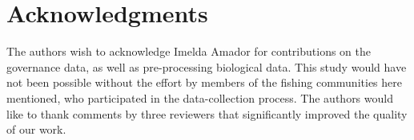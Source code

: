 \documentclass[10pt,letterpaper]{article}
\begin{document}
\section*{Acknowledgments}

The authors wish to acknowledge Imelda Amador for contributions on the governance data, as well as pre-processing biological data. This study would have not been possible without the effort by members of the fishing communities here mentioned, who participated in the data-collection process. The authors would like to thank comments by three reviewers that significantly improved the quality of our work.


\nolinenumbers

%
%
% 



\end{document}
